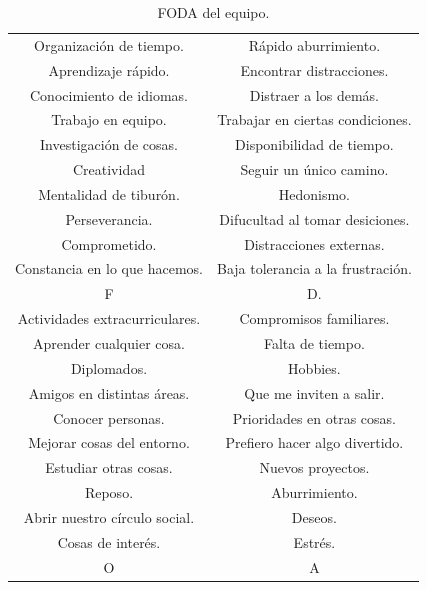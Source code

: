 \documentclass{article}
\begin{document}
\begin{center}
  \begin{table}[H]
    \centering
    \begin{tabular}{| c | c | }
      \hline
      \cellcolor{green!25}Organización de tiempo. & \cellcolor{yellow!25}Rápido aburrimiento. \\
      \cellcolor{green!25}Aprendizaje rápido. & \cellcolor{yellow!25}Encontrar distracciones. \\
      \cellcolor{green!25}Conocimiento de idiomas. & \cellcolor{yellow!25}Distraer a los demás. \\
      \cellcolor{green!25}Trabajo en equipo. & \cellcolor{yellow!25}Trabajar en ciertas condiciones. \\
      \cellcolor{green!25}Investigación de cosas. & \cellcolor{yellow!25}Disponibilidad de tiempo. \\
      \cellcolor{green!25}Creatividad & \cellcolor{yellow!25}Seguir un único camino. \\
      \cellcolor{green!25}Mentalidad de tiburón. & \cellcolor{yellow!25}Hedonismo.\\
      \cellcolor{green!25}Perseverancia. & \cellcolor{yellow!25}Difucultad al tomar desiciones.\\
      \cellcolor{green!25}Comprometido. & \cellcolor{yellow!25}Distracciones externas. \\
      \cellcolor{green!25}Constancia en lo que hacemos. & \cellcolor{yellow!25}Baja tolerancia a la frustración. \\
      \cellcolor{green!25}F & \cellcolor{yellow!25}D. \\ \hline
      \cellcolor{blue!25}Actividades extracurriculares. & \cellcolor{red!25}Compromisos familiares. \\
      \cellcolor{blue!25}Aprender cualquier cosa. & \cellcolor{red!25}Falta de tiempo. \\
      \cellcolor{blue!25}Diplomados. & \cellcolor{red!25}Hobbies. \\
      \cellcolor{blue!25}Amigos en distintas áreas. & \cellcolor{red!25}Que me inviten a salir. \\
      \cellcolor{blue!25}Conocer personas. & \cellcolor{red!25}Prioridades en otras cosas. \\
      \cellcolor{blue!25}Mejorar cosas del entorno.& \cellcolor{red!25}Prefiero hacer algo divertido. \\
      \cellcolor{blue!25}Estudiar otras cosas. & \cellcolor{red!25}Nuevos proyectos.\\
      \cellcolor{blue!25}Reposo. & \cellcolor{red!25}Aburrimiento.\\
      \cellcolor{blue!25}Abrir nuestro círculo social. & \cellcolor{red!25}Deseos. \\
      \cellcolor{blue!25}Cosas de interés. & \cellcolor{red!25}Estrés. \\
      \cellcolor{blue!25}O & \cellcolor{red!25}A\\ \hline
    \end{tabular}
    \caption{FODA del equipo.}
    \label{tabla:horarios}
  \end{table}
\end{center}
\end{document}
